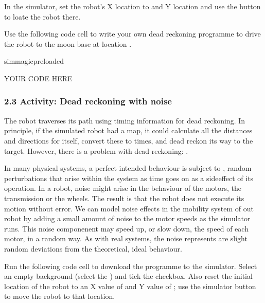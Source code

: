 \documentclass[letterpaper,10pt,english]{sphinxmanual}
\begin{document}
In the simulator, set the robot’s X location to  and Y location  and use the  button to loate the robot there.

Use the following code cell to write your own dead reckoning programme to drive the robot to the moon base at location .

{
\begin{sphinxVerbatim}[commandchars=\\\{\}]
\llap{\color{nbsphinxin}[ ]:\,\hspace{\fboxrule}\hspace{\fboxsep}}\PYGZpc{}\PYGZpc{}sim\PYGZus{}magic\PYGZus{}preloaded

\PYGZsh{} YOUR CODE HERE

\end{sphinxVerbatim}
}


\subsubsection{2.3 Activity: Dead reckoning with noise}
\label{\detokenize{content/03_Robot_Lab/Section_00_02:2.3-Activity:-Dead-reckoning-with-noise}}
The robot traverses its path using timing information for dead reckoning. In principle, if the simulated robot had a map, it could calculate all the distances and directions for itself, convert these to times, and dead reckon its way to the target. However, there is a problem with dead reckoning: .

In many physical systems, a perfect intended behaviour is subject to , random perturbations that arise within the system as time goes on as a side\sphinxhyphen{}effect of its operation. In a robot, noise might arise in the behaviour of the motors, the transmission or the wheels. The result is that the robot does not execute its motion without error. We can model noise effects in the mobility system of out robot by adding a small amount of noise to the motor speeds as the simulator runs. This noise
componenent may speed up, or slow down, the speed of each motor, in a random way. As with real systems, the noise represents are slight random deviations from the theoretical, ideal behaviour.

Run the following code cell to download the programme to the simulator. Select an empty background (select the ) and tick the  checkbox. Also reset the initial location of the robot to an X value of  and Y value of ; use the simulator  button to move the robot to that location.
\end{document}
